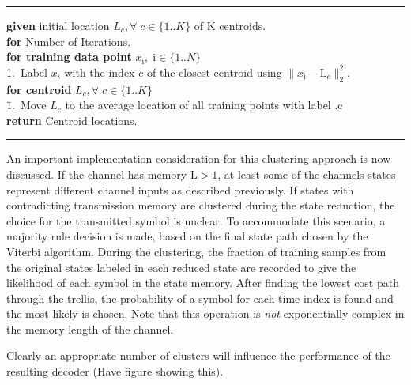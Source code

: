     \noindent\rule[10pt]{\textwidth}{0.4pt}
    {\footnotesize
    \begin{tabbing}
    {\textbf {given}} initial location $L_c, \forall \;c  \in \{1..K\}$ of K centroids.\\
        {\textbf{for} Number of Iterations}.\\
         \qquad \= {\textbf {for training data point} $x_{\mathrm{i}}, \;\mathrm{i}  \in \{1..N\}$}\\
        \qquad \qquad \= 1.\ Label $x_i$ with the index c of the closest centroid using $\|x_{\mathrm{i}}- \text{L}_c\|^2_2$. \\
        \qquad \= {\textbf {for centroid} $L_c, \forall \;c  \in \{1..K\}$}\\
                \qquad \qquad \= 1.\ Move $L_{\mathrm{c}}$ to the average location of all training points with label .c\\


        {\textbf{return}} Centroid locations.
    \end{tabbing}}
    \noindent\rule[10pt]{\textwidth}{0.4pt}
    

\par
An important implementation consideration for this clustering approach is now discussed. If the channel has memory $\text{L}>1$, at least some of the channels states represent different channel inputs as described previously. If states with contradicting transmission memory are clustered during the state reduction, the choice for the transmitted symbol is unclear. To accommodate this scenario, a majority rule decision is made, based on the final state path chosen by the Viterbi algorithm. During the clustering, the fraction of training samples from the original states labeled in each reduced state are recorded to give the likelihood of each symbol in the state memory. After finding the lowest cost path through the trellis, the probability of a symbol for each time index is found and the most likely is chosen. Note that this operation is \emph{not} exponentially complex in the memory length of the channel.

\par 
Clearly an appropriate number of clusters will influence the performance of the resulting decoder (Have figure showing this).

